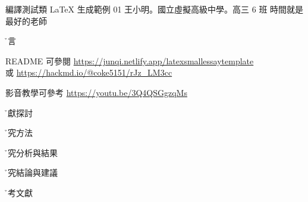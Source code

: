 \documentclass[12pt]{article}
\begin{document}
\coverpage
    {編譯測試類} %
    {LaTeX 生成範例} %
    {01 王小明。國立虛擬高級中學。高三 6 班} %
    {} %
    {} %
    {時間就是最好的老師} %
    
\h{前言}

    README 可參閱 \url{https://junqi.netlify.app/latexsmallessaytemplate}\\
    或 \url{https://hackmd.io/@coke5151/rJz_LM3cc}
    
    影音教學可參考 \url{https://youtu.be/3Q4QSGgzqMs}

\h{文獻探討}

\h{研究方法}

\h{研究分析與結果}

\h{研究結論與建議}

\clearpage %
\h{參考文獻}

\begin{enumerate}[(1)]

\end{enumerate}
\end{document}
